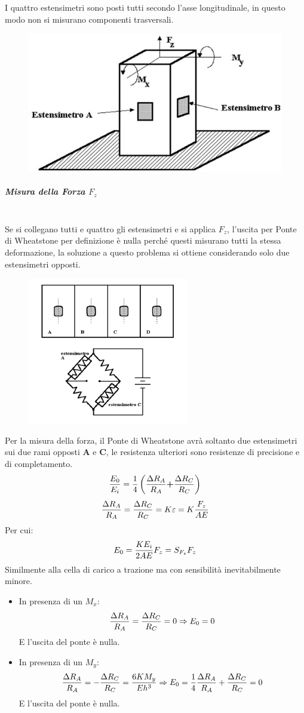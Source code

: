 \documentclass[a4paper, 15pt]{article}
\begin{document}
\begin{adjustwidth}{2in}{}
  		I quattro estensimetri sono posti tutti secondo l'asse longitudinale, in questo modo non si misurano componenti trasversali. 
\begin{figure}[H]
	\centering
	\includegraphics[width=0.3\linewidth]{immagini/23}
	\label{fig:23}
\end{figure}
\newpage
\subparagraph{Misura della Forza $F_z$}\mbox{} \\ 
  		Se si collegano tutti e quattro gli estensimetri e si applica $F_z$, l'uscita per Ponte di Wheatstone per definizione è nulla perché questi misurano tutti la stessa deformazione, la soluzione a questo problema si ottiene considerando solo due estensimetri opposti. 		
  		\begin{figure}[H]
  			\centering
  			\includegraphics[width=0.4\linewidth]{immagini/screenshot009}
  			\label{fig:screenshot009}
  		\end{figure}  		
  		Per la misura della forza, il Ponte di Wheatstone avrà soltanto due estensimetri sui due rami opposti \textbf{A} e \textbf{C}, le resistenza ulteriori sono resistenze di precisione e di completamento.  		  		
  		\[{E_0\over E_i} = {1\over4}\left({\Delta R_A\over R_A} \textbf{+} {\Delta R_C\over R_C}\right)\]  		
  		\[{\Delta R_A\over R_A} = {\Delta R_C\over R_C} = K\varepsilon = K{F_z\over AE}\]
  		Per cui:
  		\[E_0 = {KE_i\over 2AE} F_z = S_{F_z}F_z \]
  		Similmente alla cella di carico a trazione ma con sensibilità inevitabilmente minore. 		
  		\begin{itemize}
  			\item In presenza di un $M_x$:\[{\Delta R_A\over R_A} = {\Delta R_C\over R_C} = 0 \Rightarrow E_0 = 0\] E l'uscita del ponte è nulla. 
  			\item In presenza di un $M_y$:\[{\Delta R_A\over R_A} = -{\Delta R_C\over R_C} = {6KM_y\over Eh^3} \Rightarrow E_0 = {1\over4}{\Delta R_A\over R_A} + {\Delta R_C\over R_C} = 0\] E l'uscita del ponte è nulla.

\end{itemize}
\end{adjustwidth}
\end{document}
